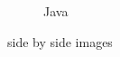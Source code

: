 \documentclass{article}
\begin{document}
\begin{enumerate}
\begin{figure}[h]
\begin{subfigure}{0.45\textwidth}
				    \caption{Java}
				    \label{secondJava}
                \end{subfigure}
                \caption{side by side images}
                \label{subfigures}
            \end{figure}
	\end{enumerate}
\end{document}
